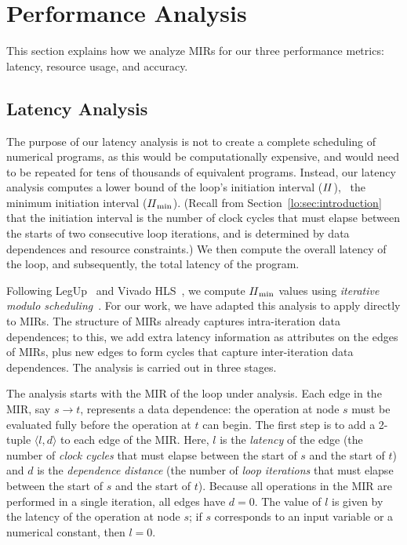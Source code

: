 \section{Performance Analysis}
\label{lo:sec:performance_analysis}

This section explains how we analyze MIRs for our three performance metrics:
latency, resource usage, and accuracy. %

\subsection{Latency Analysis}
\label{lo:sub:latency_analysis}

The purpose of our latency analysis is not to create a complete scheduling
of numerical programs, as this would be computationally expensive, and
would need to be repeated for tens of thousands of equivalent programs.
Instead, our latency analysis computes a lower bound of the loop's initiation
interval ($\mathit{II}$), \ie~the minimum initiation interval ($\mathit{II}_{\rm min}$).  (Recall from
Section~\ref{lo:sec:introduction} that the initiation interval is the number
of clock cycles that must elapse between the starts of two consecutive loop
iterations, and is determined by data dependences and resource constraints.)
We then compute the overall latency of the loop, and subsequently, the total
latency of the program.

Following LegUp~\cite{legup} and Vivado HLS~\cite{vivado_hls}, we compute
$\mathit{II}_{\rm min}$ values using \emph{iterative modulo scheduling}~\cite{rau94}. For our
work, we have adapted this analysis to apply directly to MIRs. The structure of
MIRs already captures intra-iteration data dependences; to this, we add extra
latency information as attributes on the edges of MIRs, plus new edges to form
cycles that capture inter-iteration data dependences.  The analysis is carried
out in three stages.

The analysis starts with the MIR of the loop under analysis. Each edge in the
MIR, say $s\rightarrow t$, represents a data dependence: the operation at
node $s$ must be evaluated fully before the operation at $t$ can begin. The
first step is to add a 2-tuple $\langle l, d \rangle$ to each edge of the
MIR\@. Here, $l$ is the \emph{latency} of the edge (the number of \emph{clock
cycles} that must elapse between the start of $s$ and the start of $t$) and
$d$ is the \emph{dependence distance} (the number of \emph{loop iterations}
that must elapse between the start of $s$ and the start of $t$). Because all
operations in the MIR are performed in a single iteration, all edges have
$d=0$. The value of $l$ is given by the latency of the operation at node $s$;
if $s$ corresponds to an input variable or a numerical constant, then $l=0$.

